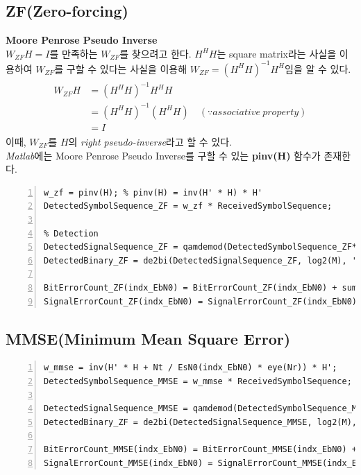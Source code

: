 \documentclass{article}
\newcommand{\bd}{\textbf} %
\begin{document}
\subsection{ZF(Zero-forcing)}
\bd{Moore Penrose Pseudo Inverse}\\
$W_{ZF}H=I$를 만족하는 $W_{ZF}$를 찾으려고 한다. $H^H H$는 square matrix라는 사실을 이용하여 $W_{ZF}$를 구할 수 있다는 사실을 이용해 $W_{ZF}=(H^H H)^{-1}H^H$임을 알 수 있다.
\begin{gather}
	\begin{split}
		W_{ZF}H&=(H^H H)^{-1}H^H H\\
		&=(H^H H)^{-1}(H^H H) \quad (\because associative\ property)\\
		&=I
	\end{split}
\end{gather}
이때, $W_{ZF}$를 $H$의 \textsl{right pseudo-inverse}라고 할 수 있다.\\
\textsl{Matlab}에는 Moore Penrose Pseudo Inverse를 구할 수 있는 \bd{pinv(H)} 함수가 존재한다.
\begin{lstlisting}[style=Matlab-editor, frame=single, numbers=left,]
% ZF Receiver
w_zf = pinv(H); % pinv(H) = inv(H' * H) * H'
DetectedSymbolSequence_ZF = w_zf * ReceivedSymbolSequence;

% Detection
DetectedSignalSequence_ZF = qamdemod(DetectedSymbolSequence_ZF*NormalizationFactor, M);
DetectedBinary_ZF = de2bi(DetectedSignalSequence_ZF, log2(M), 'left-msb');

BitErrorCount_ZF(indx_EbN0) = BitErrorCount_ZF(indx_EbN0) + sum(SignalBinary~=DetectedBinary_ZF, 'all');
SignalErrorCount_ZF(indx_EbN0) = SignalErrorCount_ZF(indx_EbN0) + sum(SignalSequence~=DetectedSignalSequence_ZF, 'all');
\end{lstlisting}
\subsection{MMSE(Minimum Mean Square Error)}
\begin{lstlisting}[style=Matlab-editor, frame=single, numbers=left,]
% MMSE Receiver
w_mmse = inv(H' * H + Nt / EsN0(indx_EbN0) * eye(Nr)) * H';
DetectedSymbolSequence_MMSE = w_mmse * ReceivedSymbolSequence; % Detection (Zero-Forcing: y / h)

DetectedSignalSequence_MMSE = qamdemod(DetectedSymbolSequence_MMSE*NormalizationFactor, M); % Detection
DetectedBinary_ZF = de2bi(DetectedSignalSequence_MMSE, log2(M), 'left-msb');

BitErrorCount_MMSE(indx_EbN0) = BitErrorCount_MMSE(indx_EbN0) + sum(SignalBinary~=DetectedBinary_ZF, 'all');
SignalErrorCount_MMSE(indx_EbN0) = SignalErrorCount_MMSE(indx_EbN0) + sum(SignalSequence~=DetectedSignalSequence_MMSE, 'all');
\end{lstlisting}
\end{document}
